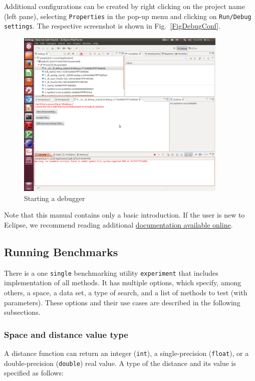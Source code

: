 \documentclass[runningheads,a4paper]{llncs}
\newcommand{\ttt}[1]{\texttt{#1}}
\begin{document}
{Additional configurations can be created by right clicking
on the project name (left pane), selecting \ttt{Properties}
in the pop-up menu and clicking on \ttt{Run/Debug settings}. 
The respective screenshot is shown in Fig.~\ref{FigDebugConf}.


\begin{figure}
\caption{\label{FigDebug}Starting a debugger}
\includegraphics[width=0.9\textwidth]{figures/EclipseDebug.pdf}
\end{figure}


Note that this manual contains only a basic introduction.
If the user is new to Eclipse, we recommend reading
additional \href{http://www.eclipse.org/downloads/moreinfo/c.php}{documentation available online}.



\subsection{Running Benchmarks}\label{SectionRunBenchmark}
There is a one \ttt{single} benchmarking utility 
\ttt{experiment} that includes implementation of all methods.
It has multiple options, which specify, among others, 
a space, a data set, a type of search, and a list of methods to test (with parameters).
These options and their use cases are described in the following subsections.

\subsubsection{Space and distance value type}

A distance function can return an integer (\ttt{int}), a single-precision (\ttt{float}),
or a double-precision (\ttt{double}) real value.
A type of the distance and its value is specified as follows:

}
\end{document}
